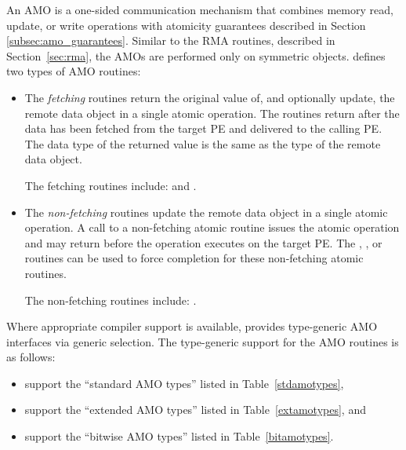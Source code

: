 An \ac{AMO} is a one-sided communication mechanism that combines memory read,
update, or write operations with atomicity guarantees described in Section~%
\ref{subsec:amo_guarantees}.  Similar to the \ac{RMA} routines, described in
Section~\ref{sec:rma}, the \acp{AMO} are performed only on symmetric objects.
\openshmem defines two types of \ac{AMO} routines:

\begin{itemize}

\item
  The \textit{fetching} routines return the original value of, and optionally
  update, the remote data object in a single atomic operation.  The routines
  return after the data has been fetched from the target \ac{PE} and delivered
  to the calling \ac{PE}.
  The data type of the returned value is the same as the type of
  the remote data object.

  The fetching routines include:
   and
  .

\item
  The \textit{non-fetching} routines update the remote data object in a single
  atomic operation.  A call to a non-fetching atomic routine issues the atomic
  operation and may return before the operation executes on the target \ac{PE}.
  The , , or 
  routines can be used to force completion for these non-fetching
  atomic routines.

  The non-fetching routines include:
  .

\end{itemize}

Where appropriate compiler support is available, \openshmem provides
type-generic \ac{AMO} interfaces via \Cstd[11] generic selection.
The type-generic support for the \ac{AMO} routines is as follows:

\begin{itemize}
\item {}
  support the ``standard \ac{AMO} types'' listed in Table~\ref{stdamotypes},
\item {} support
  the ``extended \ac{AMO} types'' listed in Table~\ref{extamotypes}, and
\item {}
  support the ``bitwise \ac{AMO} types'' listed in Table~\ref{bitamotypes}.
\end{itemize}

